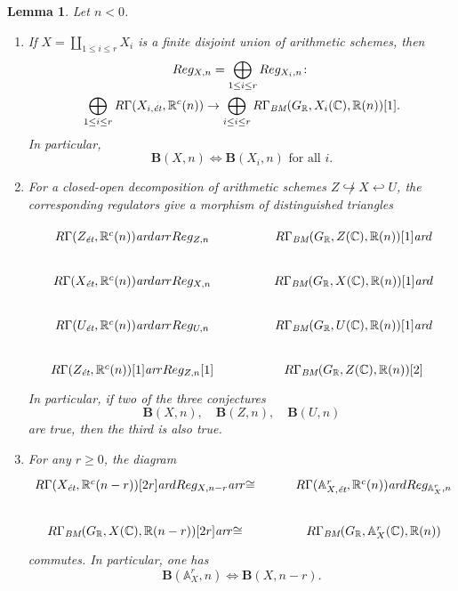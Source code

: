\documentclass[10pt,a4paper,oneside]{article}
\newcommand{\CC}{\mathbb{C}}
\newcommand{\RR}{\mathbb{R}}
\renewcommand{\AA}{\mathbb{A}}
\newcommand{\ar}{\text{\it ar}}
\newcommand{\BM}{\text{\it BM}}
\newcommand{\et}{\text{\it \'{e}t}}
\theoremstyle{myplain}
\newtheorem{lemma}[theorem]{Lemma}
\theoremstyle{mydefinition}
\numberwithin{equation}{section}
\begin{document}
\begin{lemma}
  \label{lemma:compatibility-of-B(X,n)}
  Let $n < 0$.

  \begin{enumerate}
  \item[1)] If $X = \coprod_{1 \le i \le r} X_i$ is a finite disjoint union of
    arithmetic schemes, then
    \begin{multline*}
      Reg_{X,n} = \bigoplus_{1 \le i \le r} Reg_{X_i,n}\colon\\
      \bigoplus_{1 \le i \le r} R\Gamma (X_{i,\et}, \RR^c (n)) \to
      \bigoplus_{i \le i \le r} R\Gamma_\BM (G_\RR, X_i (\CC), \RR (n)) [1].
    \end{multline*}
    In particular,
    $$\mathbf{B} (X,n) \iff \mathbf{B} (X_i,n)\text{ for all }i.$$

  \item[2)] For a closed-open decomposition of arithmetic schemes
    $Z \not\hookrightarrow X \hookleftarrow U$, the corresponding regulators
    give a morphism of distinguished triangles

    \[ \begin{tikzcd}[column sep=4em]
        R\Gamma (Z_\et, \RR^c (n)) \ar{d}\ar{r}{Reg_{Z,n}} & R\Gamma_\BM (G_\RR, Z (\CC), \RR (n)) [1] \ar{d} \\
        R\Gamma (X_\et, \RR^c (n)) \ar{d}\ar{r}{Reg_{X,n}} & R\Gamma_\BM (G_\RR, X (\CC), \RR (n)) [1] \ar{d} \\
        R\Gamma (U_\et, \RR^c (n)) \ar{d}\ar{r}{Reg_{U,n}} & R\Gamma_\BM (G_\RR, U (\CC), \RR (n)) [1] \ar{d} \\
        R\Gamma (Z_\et, \RR^c (n)) [1]\ar{r}{Reg_{Z,n} [1]} & R\Gamma_\BM (G_\RR, Z (\CC), \RR (n)) [2]
      \end{tikzcd} \]
    In particular, if two of the three conjectures
    \[ \mathbf{B} (X,n), \quad
      \mathbf{B} (Z,n), \quad
      \mathbf{B} (U,n) \]
    are true, then the third is also true.

  \item[3)] For any $r \ge 0$, the diagram
    \[ \begin{tikzcd}
        R\Gamma (X_\et, \RR^c (n-r)) [2r] \ar{d}{Reg_{X,n-r}}\ar{r}{\cong} & R\Gamma (\AA^r_{X,\et}, \RR^c (n))\ar{d}{Reg_{\AA^r_X,n}} \\
        R\Gamma_\BM (G_\RR, X (\CC), \RR (n-r)) [2r] \ar{r}{\cong} & R\Gamma_\BM (G_\RR, \AA^r_X (\CC), \RR (n))
      \end{tikzcd} \]
    commutes. In particular, one has
    $$\mathbf{B} (\AA^r_X, n) \iff \mathbf{B} (X, n-r).$$
  \end{enumerate}


\end{lemma}
\end{document}
